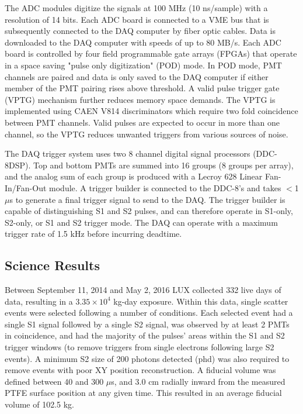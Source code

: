 The ADC modules digitize the signals at 100 MHz (10 ns/sample) with a resolution of 14 bits. Each ADC board is connected to a VME bus that is subsequently connected to the DAQ computer by fiber optic cables.  Data is downloaded to the DAQ computer with speeds of up to 80 MB/s.  Each ADC board is controlled by four field programmable gate arrays (FPGAs) that operate in a space saving "pulse only digitization" (POD) mode. In POD mode, PMT channels are paired and data is only saved to the DAQ computer if either member of the PMT pairing rises above threshold. A valid pulse trigger gate (VPTG) mechanism further reduces memory space demands.  The VPTG is implemented using CAEN V814 discriminators which require two fold coincidence between PMT channels. Valid pulses are expected to occur in more than one channel, so the VPTG reduces unwanted triggers from various sources of noise.

The DAQ trigger system uses two 8 channel digital signal processors (DDC-8DSP).  
Top and bottom PMTs are summed into 16 groups (8 groups per array), and the analog sum of each group is produced with a Lecroy 628 Linear Fan-In/Fan-Out module.  
A trigger builder is connected to the DDC-8’s and takes $<$1 $\mu$s to generate a final trigger signal to send to the DAQ.  The trigger builder is capable of distinguishing S1 and S2 pulses, and can therefore operate in S1-only, S2-only, or S1 and S2 trigger mode.  The DAQ can operate with a maximum trigger rate of 1.5 kHz before incurring deadtime. 

\subsection{Science Results}

Between September 11, 2014  and May 2, 2016 LUX collected 332 live days of data, resulting in a $3.35 \times 10^4$ kg-day exposure.  Within this data, single scatter events were selected following a number of conditions.  Each selected event had a single S1 signal followed by a single S2 signal, was observed by at least 2 PMTs in coincidence, and had the majority of the pulses' areas within the S1 and S2 trigger windows (to remove triggers from single electrons following large S2 events).  A minimum S2 size of 200 photons detected (phd) was also required to remove events with poor XY position reconstruction.  A fiducial volume was defined between 40 and 300 $\mu$s, and 3.0 cm radially inward from the measured PTFE surface position at any given time.  This resulted in an average fiducial volume of 102.5 kg.

